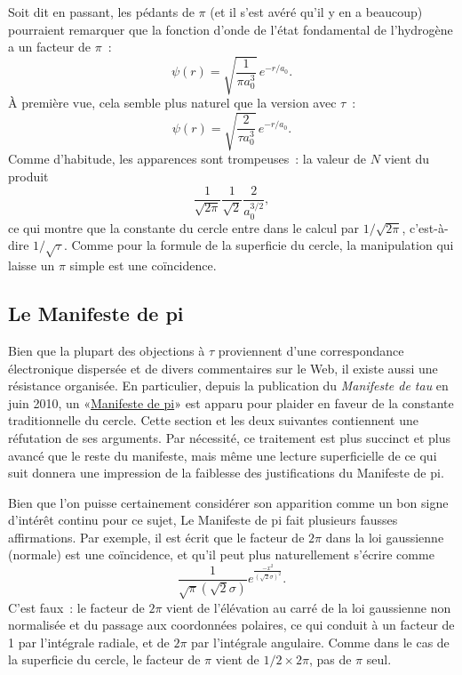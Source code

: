Soit dit en passant, les pédants de $\pi$ (et il s'est avéré qu'il y en a beaucoup) pourraient
remarquer que la fonction d'onde de l'état fondamental de l'hydrogène a un
facteur de $\pi$~:
\[
\psi(r) = \sqrt{\frac{1}{\pi a_0^3}}\,e^{-r/a_0}.
\]
À première vue, cela semble plus naturel que la version avec $\tau$~:
\[
\psi(r) = \sqrt{\frac{2}{\tau a_0^3}}\,e^{-r/a_0}.
\]
Comme d'habitude, les apparences sont trompeuses~: la valeur de $N$ vient du
produit
\[
\frac{1}{\sqrt{2\pi}} \frac{1}{\sqrt{2}} \frac{2}{a_0^{3/2}},
\]
ce qui montre que la constante du cercle entre dans le calcul par
$1/\sqrt{2\pi}$, c'est-à-dire $1/\sqrt{\tau}$. Comme pour la formule de la
superficie du cercle, la manipulation qui laisse un $\pi$ simple est une
coïncidence.


  \subsection{Le Manifeste de pi} %
  \label{sec:the_pi_manifesto_a_rebuttal}

Bien que la plupart des objections à $\tau$ proviennent d'une correspondance
électronique dispersée et de divers commentaires sur le Web, il existe aussi une
résistance organisée. En particulier, depuis la publication du \emph{Manifeste
de tau} en juin 2010, un «\ns \href{http://thepimanifesto.com/}{Manifeste de
pi}\ns » est apparu pour plaider en faveur de la constante traditionnelle du
cercle. Cette section et les deux suivantes contiennent une réfutation de ses
arguments. Par nécessité, ce traitement est plus succinct et plus avancé que le
reste du manifeste, mais même une lecture superficielle de ce qui suit donnera
une impression de la faiblesse des justifications du Manifeste de pi.

Bien que l'on puisse certainement considérer son apparition
comme un bon signe d'intérêt continu pour ce sujet, Le Manifeste de pi fait plusieurs fausses
affirmations. Par exemple, il est écrit que le facteur de $2\pi$ dans la loi
gaussienne (normale) est une coïncidence, et qu'il peut plus naturellement
s'écrire comme
\[
\frac{1}{\sqrt\pi(\sqrt 2\sigma)}e^{\frac{-x^2}{(\sqrt 2\sigma)^2}}.
\]
C'est faux~: le facteur de $2\pi$ vient de l'élévation au carré de la loi
gaussienne non normalisée et du passage aux coordonnées polaires, ce qui conduit
à un facteur de 1 par l'intégrale radiale, et de $2\pi$ par l'intégrale angulaire. Comme
dans le cas de la superficie du cercle, le facteur de $\pi$ vient de $1/2\times
2\pi$, pas de $\pi$ seul.

